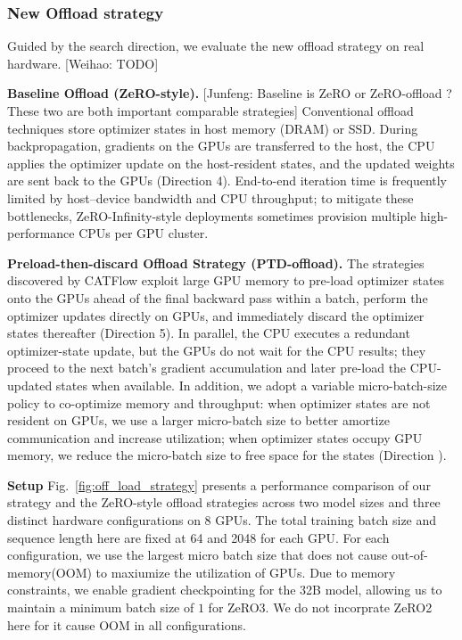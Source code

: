 \documentclass[letterpaper,twocolumn,10pt]{article}
\newcommand{\name}{CATFlow}
\newcommand{\junfeng}[1]{{\color{blue}[Junfeng: #1]}}
\newcommand{\weihao}[1]{{\color{red}[Weihao: #1]}}
\begin{document}
\subsubsection{New Offload strategy} 

Guided by the search direction, we evaluate the new offload strategy on real hardware. \weihao {TODO}

\textbf{Baseline Offload (ZeRO-style).} 
\junfeng{Baseline is ZeRO or ZeRO-offload ? These two are both important comparable strategies}
Conventional offload techniques store optimizer states in host memory (DRAM) or SSD. During backpropagation, gradients on the GPUs are transferred to the host, the CPU applies the optimizer update on the host-resident states, and the updated weights are sent back to the GPUs (Direction 4). End-to-end iteration time is frequently limited by host--device bandwidth and CPU throughput; to mitigate these bottlenecks, ZeRO-Infinity-style deployments sometimes provision multiple high-performance CPUs per GPU cluster.

\textbf{Preload-then-discard Offload Strategy (PTD-offload).} The strategies discovered by \name{} exploit large GPU memory to pre-load optimizer states onto the GPUs ahead of the final backward pass within a batch, perform the optimizer updates directly on GPUs, and immediately discard the optimizer states thereafter (Direction 5). In parallel, the CPU executes a redundant optimizer-state update, but the GPUs do not wait for the CPU results; they proceed to the next batch's gradient accumulation and later pre-load the CPU-updated states when available. In addition, we adopt a variable micro-batch-size policy to co-optimize memory and throughput: when optimizer states are not resident on GPUs, we use a larger micro-batch size to better amortize communication and increase utilization; when optimizer states occupy GPU memory, we reduce the micro-batch size to free space for the states (Direction ).

\textbf {Setup}
Fig.~\ref{fig:off_load_strategy} presents a performance comparison of our strategy and the ZeRO-style offload strategies across two model sizes and three distinct hardware configurations on 8 GPUs. The total training batch size and sequence length here are fixed at 64 and 2048 for each GPU. For each configuration, we use the largest micro batch size that does not cause out-of-memory(OOM) to maxiumize the utilization of GPUs. Due to memory constraints, we enable gradient checkpointing for the 32B model, allowing us to maintain a minimum batch size of $1$ for ZeRO3.  We do not incorprate ZeRO2 here for it cause OOM in all configurations. 
\end{document}
